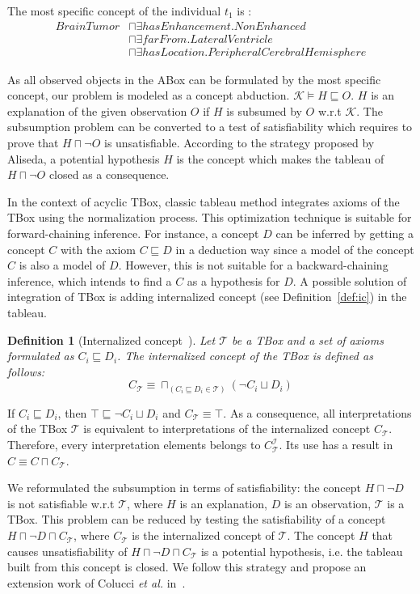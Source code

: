 \documentclass{article}
\newtheorem{mydef}{Definition}
\begin{document}
The most specific concept of the  individual $t_1$ is :\vspace{-0.3cm}
\begin{align*}
 BrainTumor&\sqcap \exists hasEnhancement.NonEnhanced \\
 &\sqcap \exists farFrom.LateralVentricle\\
 &\sqcap \exists hasLocation.PeripheralCerebralHemisphere
\end{align*}

As all observed objects in the ABox can be formulated by the most specific concept, our problem is modeled as a concept abduction.
$\mathcal{K}\vDash H\sqsubseteq O$.  $H$ is an explanation of the given observation $O$ if $H$ is subsumed by $O$ w.r.t  $\mathcal{K}$. 
The subsumption problem can be converted to a test of satisfiability which requires to prove that $H\sqcap \neg O$ is unsatisfiable.
According to the strategy proposed by Aliseda, a potential hypothesis $H$ is the concept which makes the tableau of  $H\sqcap \neg O$ closed as a consequence.

In the context of acyclic TBox, classic tableau method integrates axioms of the TBox using the normalization process. This optimization technique is suitable for forward-chaining inference.
For instance, a concept $D$ can be inferred by getting a concept $C$ with the axiom $C\sqsubseteq D$ in a deduction way since a model of the concept $C$ is also a model of $D$.
However, this is not suitable for a backward-chaining inference, which intends to find a $C$ as a hypothesis for $D$. A possible solution of integration of TBox is adding 
internalized concept (see Definition~\ref{def:ic}) in the tableau.
\begin{mydef}[Internalized concept~\cite{baader2003description}]
Let $\mathcal{T}$ be a TBox and a set of axioms formulated as $C_i \sqsubseteq D_i$. The internalized concept of the TBox is defined as follows:
$$C_\mathcal{T} \equiv \sqcap_{(C_i \sqsubseteq D_i\in \mathcal{T})} (\neg C_i \sqcup D_i) $$
\end{mydef}\label{def:ic}
If $C_i \sqsubseteq D_i$, then $\top \sqsubseteq \neg C_i  \sqcup D_i$ and  $C_\mathcal{T}\equiv \top$. 
As a consequence, all interpretations of the TBox $\mathcal{T}$ is equivalent to interpretations of the internalized concept $C_\mathcal{T}$.
Therefore, every interpretation elements belongs to  $C_\mathcal{T}^\mathcal{I}$. 
Its use has a result in $C\equiv C\sqcap C_\mathcal{T}$.


We reformulated the subsumption in terms of satisfiability: the concept $H \sqcap \neg D$ is not satisfiable w.r.t $\mathcal{T}$, where $H$ is an explanation, $D$ is an observation,
$\mathcal{T}$ is a TBox. This problem can be reduced by testing the satisfiability of a concept $ H\sqcap \neg D \sqcap C_\mathcal{T}$, where $ C_\mathcal{T}$ is the internalized concept of $\mathcal{T}$.
The concept $H$ that causes unsatisfiability of $H\sqcap\neg D\sqcap C_\mathcal{T}$ is a potential hypothesis, i.e. the tableau built from this concept is closed.
We follow this strategy and propose an extension work of Colucci \textit{et al.} in~\cite{colucci2004uniform}.
\end{document}
